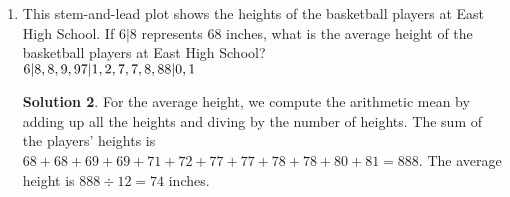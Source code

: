 \documentclass{article}
\theoremstyle{definition}
\newtheorem*{solution}{Solution}
\begin{document}
\begin{enumerate}
        \begin{solution}
            Each of the 10 questions will either be true or false, so there are $2 ^ {10} = 1024$ possible
            combinations of answers for the test. There are ``10 choose 6" or
            $_{10}C_6 = \frac{10!}{4!6!} = \frac{10\cdot9\cdot8\cdot7}{4\cdot3\cdot2\cdot1} = 10\cdot3\cdot7 = 210$
            ways to get exactly $6$ correct answers. So, the proabbility is $\frac{210}{1024} = \frac{105}{512}$.
        \end{solution}
        \item This stem-and-lead plot shows the heights of the basketball players at East High School.
        If $6 | 8$ represents $68$ inches, what is the average height of the basketball players
        at East High School?\\
        $6 | 8, 8, 9, 9 \\ 7 | 1, 2, 7, 7, 8, 8 \\ 8 | 0, 1$
        \begin{solution}
            For the average height, we compute the arithmetic mean by adding up all the heights
            and diving by the number of heights. The sum of the players' heights is
            $68 + 68 + 69 + 69+ 71 + 72 + 77 + 77 +78 +78 +80 + 81 = 888$. The average height
            is $888 \div 12 = 74$ inches.
        \end{solution}
    \end{enumerate}
\end{document}
